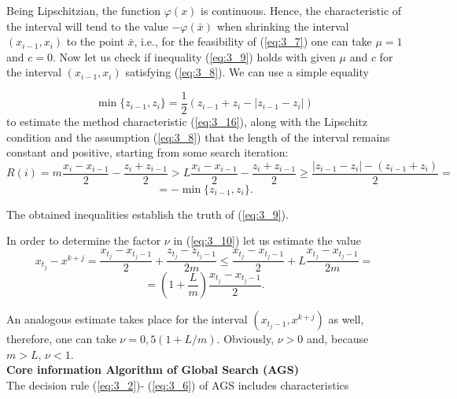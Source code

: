 	Being Lipschitzian, the function $\varphi(x)$ is continuous. Hence, the characteristic of the interval will tend to the value $-\varphi (\bar{x})$ when shrinking the interval $(x_{i-1} ,x_{i} )$ to the point $\bar{x}$, i.e., for the feasibility of  (\ref{eq:3_7}) one can take $\mu= 1$ and $c=0$. Now let us check if inequality  (\ref{eq:3_9}) holds with given $\mu$ and $c$ for the interval $(x_{i-1} ,x_{i} )$ satisfying  (\ref{eq:3_8}). We can use a simple equality 
	
	\begin{equation}
	\label{eq:3_19}
	\min \{ z_{i-1} ,z_{i} \} =\frac{1}{2} (z_{i-1} +z_{i} -\left|z_{i-1} -z_{i} \right|)
	\end{equation}
	to estimate the method characteristic  (\ref{eq:3_16}), along with the Lipschitz condition and the assumption  (\ref{eq:3_8}) that the length of the interval remains constant and positive, starting from some search iteration:
	\begin{displaymath}
	R(i)=m\frac{x_{i} -x_{i-1} }{2} -\frac{z_{i} +z_{i-1} }{2} >L\frac{x_{i} -x_{i-1} }{2} -\frac{z_{i} +z_{i-1} }{2} \ge \frac{\left|z_{i-1} -z_{i} \right|-(z_{i-1} +z_{i} )}{2} =
	\end{displaymath}
	\begin{displaymath}
	=-\min \{ z_{i-1} ,z_{i} \}. 
	\end{displaymath}
	
	The obtained inequalities establish the truth of  (\ref{eq:3_9}).
	
	In order to determine the factor $\nu $ in  (\ref{eq:3_10}) let us estimate the value
	\begin{displaymath}
	x_{t_{j} } -x^{k+j} =\frac{x_{t_{j} } -x_{t_{j} -1} }{2} +\frac{z_{t_{j} } -z_{t_{j} -1} }{2m} \le \frac{x_{t_{j} } -x_{t_{j} -1} }{2} +L\frac{x_{t_{j} } -x_{t_{j} -1} }{2m} = 
	\end{displaymath}
		\begin{displaymath}
	 =\left(1+\frac{L}{m} \right)\frac{x_{t_{j} } -x_{t_{j} -1} }{2} . 
	\end{displaymath}
	
	An analogous estimate takes place for the interval $(x_{t_{j} -1} ,x^{k+j} )$ as well, therefore, one can take $\nu =0,5(1+L/m)$. Obviously, $\nu >0$ and, because $m>L$, $\nu <1$. \\
	
	\textbf{Core information Algorithm of Global Search (AGS)} \\
	
	The decision rule  (\ref{eq:3_2})- (\ref{eq:3_6}) of AGS includes characteristics 
	
